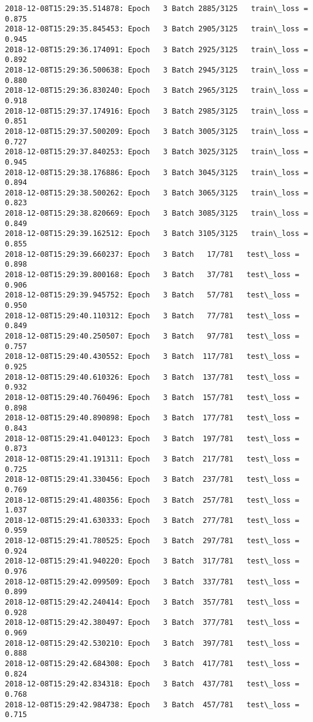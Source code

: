 \documentclass[11pt]{article}
\begin{document}
\begin{Verbatim}[commandchars=\\\{\}]
2018-12-08T15:29:35.514878: Epoch   3 Batch 2885/3125   train\_loss = 0.875
2018-12-08T15:29:35.845453: Epoch   3 Batch 2905/3125   train\_loss = 0.945
2018-12-08T15:29:36.174091: Epoch   3 Batch 2925/3125   train\_loss = 0.892
2018-12-08T15:29:36.500638: Epoch   3 Batch 2945/3125   train\_loss = 0.880
2018-12-08T15:29:36.830240: Epoch   3 Batch 2965/3125   train\_loss = 0.918
2018-12-08T15:29:37.174916: Epoch   3 Batch 2985/3125   train\_loss = 0.851
2018-12-08T15:29:37.500209: Epoch   3 Batch 3005/3125   train\_loss = 0.727
2018-12-08T15:29:37.840253: Epoch   3 Batch 3025/3125   train\_loss = 0.945
2018-12-08T15:29:38.176886: Epoch   3 Batch 3045/3125   train\_loss = 0.894
2018-12-08T15:29:38.500262: Epoch   3 Batch 3065/3125   train\_loss = 0.823
2018-12-08T15:29:38.820669: Epoch   3 Batch 3085/3125   train\_loss = 0.849
2018-12-08T15:29:39.162512: Epoch   3 Batch 3105/3125   train\_loss = 0.855
2018-12-08T15:29:39.660237: Epoch   3 Batch   17/781   test\_loss = 0.898
2018-12-08T15:29:39.800168: Epoch   3 Batch   37/781   test\_loss = 0.906
2018-12-08T15:29:39.945752: Epoch   3 Batch   57/781   test\_loss = 0.950
2018-12-08T15:29:40.110312: Epoch   3 Batch   77/781   test\_loss = 0.849
2018-12-08T15:29:40.250507: Epoch   3 Batch   97/781   test\_loss = 0.757
2018-12-08T15:29:40.430552: Epoch   3 Batch  117/781   test\_loss = 0.925
2018-12-08T15:29:40.610326: Epoch   3 Batch  137/781   test\_loss = 0.932
2018-12-08T15:29:40.760496: Epoch   3 Batch  157/781   test\_loss = 0.898
2018-12-08T15:29:40.890898: Epoch   3 Batch  177/781   test\_loss = 0.843
2018-12-08T15:29:41.040123: Epoch   3 Batch  197/781   test\_loss = 0.873
2018-12-08T15:29:41.191311: Epoch   3 Batch  217/781   test\_loss = 0.725
2018-12-08T15:29:41.330456: Epoch   3 Batch  237/781   test\_loss = 0.769
2018-12-08T15:29:41.480356: Epoch   3 Batch  257/781   test\_loss = 1.037
2018-12-08T15:29:41.630333: Epoch   3 Batch  277/781   test\_loss = 0.959
2018-12-08T15:29:41.780525: Epoch   3 Batch  297/781   test\_loss = 0.924
2018-12-08T15:29:41.940220: Epoch   3 Batch  317/781   test\_loss = 0.976
2018-12-08T15:29:42.099509: Epoch   3 Batch  337/781   test\_loss = 0.899
2018-12-08T15:29:42.240414: Epoch   3 Batch  357/781   test\_loss = 0.928
2018-12-08T15:29:42.380497: Epoch   3 Batch  377/781   test\_loss = 0.969
2018-12-08T15:29:42.530210: Epoch   3 Batch  397/781   test\_loss = 0.888
2018-12-08T15:29:42.684308: Epoch   3 Batch  417/781   test\_loss = 0.824
2018-12-08T15:29:42.834318: Epoch   3 Batch  437/781   test\_loss = 0.768
2018-12-08T15:29:42.984738: Epoch   3 Batch  457/781   test\_loss = 0.715

\end{Verbatim}
\end{document}
